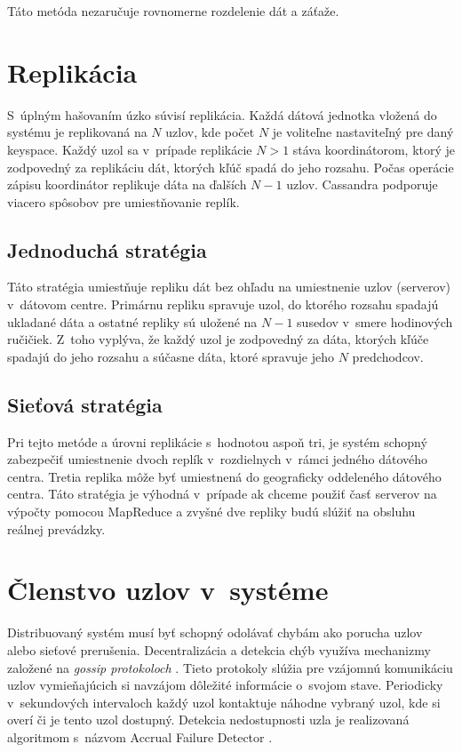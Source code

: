 \documentclass[11pt,twoside,a4paper]{book}
\begin{document}
Táto metóda nezaručuje rovnomerne rozdelenie dát a záťaže.


\section{Replikácia}

S~úplným hašovaním úzko súvisí replikácia. Každá dátová jednotka vložená do systému je replikovaná na $N$ uzlov, kde počet $N$ je voliteľne nastaviteľný pre daný keyspace. Každý uzol sa v~prípade replikácie $N > 1$ stáva koordinátorom, ktorý je zodpovedný za replikáciu dát, ktorých kľúč spadá do jeho rozsahu. Počas operácie zápisu koordinátor replikuje dáta na ďalších $N - 1$ uzlov. Cassandra podporuje viacero spôsobov pre umiestňovanie replík.

\subsection*{Jednoduchá stratégia}

Táto stratégia umiestňuje repliku dát bez ohľadu na umiestnenie uzlov (serverov) v~dátovom centre. Primárnu repliku spravuje uzol, do ktorého rozsahu spadajú ukladané dáta a ostatné repliky sú uložené na $N - 1$ susedov v~smere hodinových ručičiek. Z~toho vyplýva, že každý uzol je zodpovedný za dáta, ktorých kľúče spadajú do jeho rozsahu a súčasne dáta, ktoré spravuje jeho $N$ predchodcov.

\subsection*{Sieťová stratégia}

Pri tejto metóde a úrovni replikácie s~hodnotou aspoň tri, je systém schopný zabezpečiť umiestnenie dvoch replík v~rozdielnych \emph{} v~rámci jedného dátového centra. Tretia replika môže byť umiestnená do geograficky oddeleného dátového centra. Táto stratégia je výhodná v~prípade ak chceme použiť časť serverov na výpočty pomocou MapReduce a zvyšné dve repliky budú slúžiť na obsluhu reálnej prevádzky.

\section{Členstvo uzlov v~systéme}

Distribuovaný systém musí byť schopný odolávať chybám ako porucha uzlov alebo sieťové prerušenia. Decentralizácia a detekcia chýb využíva mechanizmy založené na \emph{gossip protokoloch} \cite{ganesh2003peer}. Tieto protokoly slúžia pre vzájomnú komunikáciu uzlov vymieňajúcich si navzájom dôležité informácie o~svojom stave. Periodicky v~sekundových intervaloch každý uzol kontaktuje náhodne vybraný uzol, kde si overí či je tento uzol dostupný. Detekcia nedostupnosti uzla je realizovaná algoritmom s~názvom Accrual Failure Detector \cite{hayashibara2004}.
\end{document}
